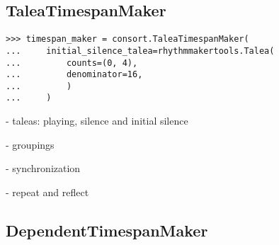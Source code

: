 \subsection{TaleaTimespanMaker} %

\begin{comment}
<abjad>
timespan_maker = consort.TaleaTimespanMaker(
    initial_silence_talea=rhythmmakertools.Talea(
        counts=(0, 4),
        denominator=16,
        )
    )
</abjad>
\end{comment}

\begin{singlespacing}
\vspace{-0.5\baselineskip}
\begin{lstlisting}
>>> timespan_maker = consort.TaleaTimespanMaker(
...     initial_silence_talea=rhythmmakertools.Talea(
...         counts=(0, 4),
...         denominator=16,
...         )
...     )
\end{lstlisting}
\end{singlespacing}

- taleas: playing, silence and initial silence

- groupings

- synchronization

- repeat and reflect

\subsection{DependentTimespanMaker} %

\begin{comment}
<abjad>
timespan_inventory = timespantools.TimespanInventory([
    consort.PerformedTimespan(0, 10, voice_name='Piano Upper Voice'),
    consort.PerformedTimespan(10, 20, voice_name='Piano Upper Voice'),
    consort.PerformedTimespan(25, 30, voice_name='Piano Upper Voice'),
    consort.PerformedTimespan(50, 60, voice_name='Piano Upper Voice'),
    consort.PerformedTimespan(0, 10, voice_name='Piano Lower Voice'),
    consort.PerformedTimespan(15, 35, voice_name='Piano Lower Voice'),
    consort.PerformedTimespan(40, 45, voice_name='Piano Lower Voice'),
    consort.PerformedTimespan(45, 75, voice_name='Piano Lower Voice'),
    ])
show(timespan_inventory, key='voice_name')
</abjad>
\end{comment}


